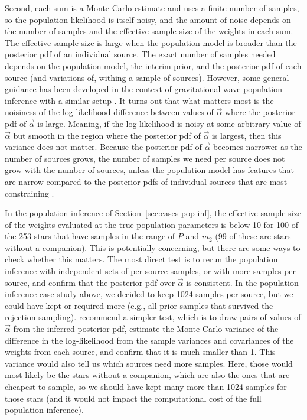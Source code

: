 \documentclass[twocolumn]{AASTeX7/aastex701}
\begin{document}
Second, each sum is a Monte Carlo estimate and uses a finite number of samples, so the
population likelihood is itself noisy, and the amount of noise depends on the number of
samples and the effective sample size of the weights in each sum.
The effective sample size is large when the population model is broader than the
posterior pdf of an individual source.
The exact number of samples needed depends on the population model, the interim prior,
and the posterior pdf of each source (and variations of, withing a sample of sources).
However, some general guidance has been developed in the context of gravitational-wave
population inference with a similar setup \citep{Essick:2022}.
It turns out that what matters most is the noisiness of the log-likelihood difference
between values of $\vec{\alpha}$ where the posterior pdf of $\vec{\alpha}$ is large.
Meaning, if the log-likelihood is noisy at some arbitrary value of $\vec{\alpha}$ but
smooth in the region where the posterior pdf of $\vec{\alpha}$ is largest, then this
variance does not matter.
Because the posterior pdf of $\vec{\alpha}$ becomes narrower as the number of sources
grows, the number of samples we need per source does not grow with the number of
sources, unless the population model has features that are narrow compared to the
posterior pdfs of individual sources that are most constraining \citep{Essick:2022}.

In the population inference of Section~\ref{sec:cases-pop-inf}, the effective sample
size of the weights evaluated at the true population parameters is below 10 for 100 of
the 253 stars that have samples in the range of $P$ and $m_2$ (99 of these are stars
without a companion).
This is potentially concerning, but there are some ways to check whether this matters.
The most direct test is to rerun the population inference with independent sets of
per-source samples, or with more samples per source, and confirm that the posterior pdf
over $\vec{\alpha}$ is consistent.
In the population inference case study above, we decided to keep 1024 samples per
source, but we could have kept or required more (e.g., all prior samples that survived
the rejection sampling).
\citet{Essick:2022} recommend a simpler test, which is to draw pairs of values of
$\vec{\alpha}$ from the inferred posterior pdf, estimate the Monte Carlo variance of the
difference in the log-likelihood from the sample variances and covariances of the
weights from each source, and confirm that it is much smaller than 1.
This variance would also tell us which sources need more samples.
Here, those would most likely be the stars without a companion, which are also the ones
that are cheapest to sample, so we should have kept many more than 1024 samples for
those stars (and it would not impact the computational cost of the full population
inference).
\end{document}
